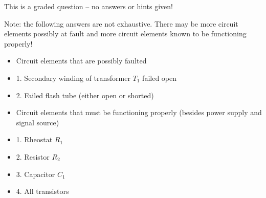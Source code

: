 \vfil 

\eject






This is a graded question -- no answers or hints given!







Note: the following answers are not exhaustive.  There may be more circuit elements possibly at fault and more circuit elements known to be functioning properly!

\begin{itemize}
\item{} Circuit elements that are possibly faulted
\item{1.} Secondary winding of transformer $T_1$ failed open
\item{2.} Failed flash tube (either open or shorted)
\end{itemize}

\begin{itemize}
\item{} Circuit elements that must be functioning properly (besides power supply and signal source)
\item{1.} Rheostat $R_1$
\item{2.} Resistor $R_2$
\item{3.} Capacitor $C_1$
\item{4.} All transistors
\end{itemize}





